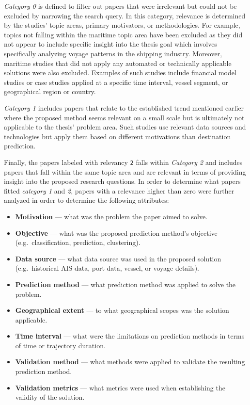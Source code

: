 \textit{Category 0} is defined to filter out papers that were irrelevant but could not be excluded by narrowing the search query. In this category, relevance is determined by the studies' topic areas, primary motivators, or methodologies. For example, topics not falling within the maritime topic area have been excluded as they did not appear to include specific insight into the thesis goal which involves specifically analyzing voyage patterns in the shipping industry. Moreover, maritime studies that did not apply any automated or technically applicable solutions were also excluded. Examples of such studies include financial model studies or case studies applied at a specific time interval, vessel segment, or geographical region or country.

\textit{Category 1} includes papers that relate to the established trend mentioned earlier where the proposed method seems relevant on a small scale but is ultimately not applicable to the thesis' problem area. Such studies use relevant data sources and technologies but apply them based on different motivations than destination prediction.

Finally, the papers labeled with relevancy \texttt{2} falls within \textit{Category 2} and includes papers that fall within the same topic area and are relevant in terms of providing insight into the proposed research questions. In order to determine what papers fitted \textit{category 1} and \textit{2}, papers with a relevance higher than zero were further analyzed in order to determine the following attributes:

\begin{itemize}
    \item \textbf{Motivation} --- what was the problem the paper aimed to solve.
    \item \textbf{Objective} --- what was the proposed prediction method's objective (e.g.\ classification, prediction, clustering).
    \item \textbf{Data source} --- what data source was used in the proposed solution (e.g.\ historical AIS data, port data, vessel, or voyage details).
    \item \textbf{Prediction method} --- what prediction method was applied to solve the problem.
    \item \textbf{Geographical extent} --- to what geographical scopes was the solution applicable.
    \item \textbf{Time interval} --- what were the limitations on prediction methods in terms of time or trajectory duration.
    \item \textbf{Validation method} --- what methods were applied to validate the resulting prediction method.
    \item \textbf{Validation metrics} --- what metrics were used when establishing the validity of the solution.
\end{itemize}

